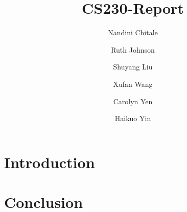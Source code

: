 \documentclass[acmlarge]{acmart}
\title{CS230-Report}
\author{Nandini Chitale}
\author{Ruth Johnson}
\author{Shuyang Liu}
\author{Xufan Wang}
\author{Carolyn Yen}
\author{Haikuo Yin}
\begin{document}
\maketitle

\begin{abstract}
    
\end{abstract}
\section{Introduction}

\section{Conclusion}



\end{document}
